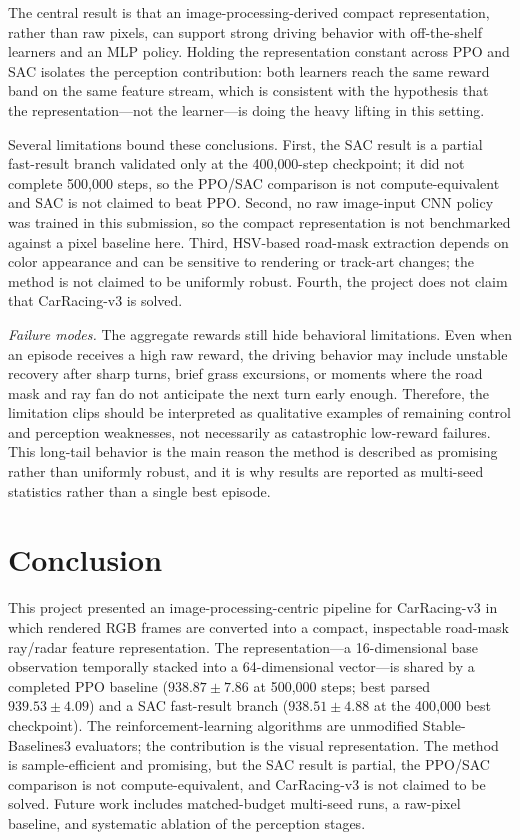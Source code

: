 \documentclass[conference]{IEEEtran}
\begin{document}
The central result is that an image-processing-derived compact representation,
rather than raw pixels, can support strong driving behavior with off-the-shelf
learners and an MLP policy. Holding the representation constant across PPO and
SAC isolates the perception contribution: both learners reach the same reward
band on the same feature stream, which is consistent with the hypothesis that
the representation---not the learner---is doing the heavy lifting in this
setting.

Several limitations bound these conclusions. First, the SAC result is a partial
fast-result branch validated only at the 400{,}000-step checkpoint; it did not
complete 500{,}000 steps, so the PPO/SAC comparison is not compute-equivalent
and SAC is not claimed to beat PPO. Second, no raw image-input CNN policy was
trained in this submission, so the compact representation is not benchmarked
against a pixel baseline here. Third, HSV-based road-mask extraction depends on
color appearance and can be sensitive to rendering or track-art changes; the
method is not claimed to be uniformly robust. Fourth, the project does not claim
that CarRacing-v3 is solved.

\emph{Failure modes.} The aggregate rewards still hide behavioral limitations.
Even when an episode receives a high raw reward, the driving behavior may include
unstable recovery after sharp turns, brief grass excursions, or moments where
the road mask and ray fan do not anticipate the next turn early enough.
Therefore, the limitation clips should be interpreted as qualitative examples of
remaining control and perception weaknesses, not necessarily as catastrophic
low-reward failures. This long-tail behavior is the main reason the method is
described as promising rather than uniformly robust, and it is why results are
reported as multi-seed statistics rather than a single best episode.

\section{Conclusion}

This project presented an image-processing-centric pipeline for CarRacing-v3 in
which rendered RGB frames are converted into a compact, inspectable road-mask
ray/radar feature representation. The representation---a 16-dimensional base
observation temporally stacked into a 64-dimensional vector---is shared by a
completed PPO baseline ($938.87\pm7.86$ at 500{,}000 steps; best parsed
$939.53\pm4.09$) and a SAC fast-result branch ($938.51\pm4.88$ at the 400{,}000
best checkpoint). The reinforcement-learning algorithms are unmodified
Stable-Baselines3 evaluators; the contribution is the visual representation.
The method is sample-efficient and promising, but the SAC result is partial,
the PPO/SAC comparison is not compute-equivalent, and CarRacing-v3 is not
claimed to be solved. Future work includes matched-budget multi-seed runs, a
raw-pixel baseline, and systematic ablation of the perception stages.
\end{document}
